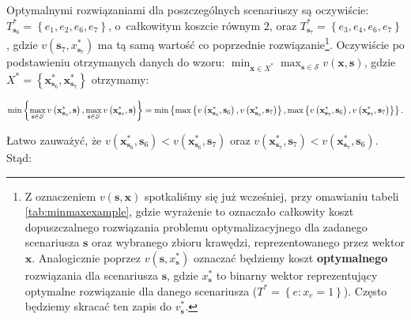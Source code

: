 Optymalnymi rozwiązaniami dla poszczególnych scenariuszy są oczywiście: $T^{\ast}_{\textbf{s}_{6}} = \left\{ e_{1}, e_{2}, e_{6}, e_{7} \right\}$, o~całkowitym koszcie równym $2$, oraz $T^{\ast}_{\textbf{s}_{7}} = \left\{ e_{3}, e_{4}, e_{6}, e_{7} \right\}$, gdzie $v \left( \textbf{s}_{7}, x^{\ast}_{\textbf{s}_{7}} \right)$ ma tą samą wartość co poprzednie rozwiązanie\footnote{
	Z oznaczeniem $v \left( \textbf{s}, \textbf{x} \right)$ spotkaliśmy się już wcześniej, przy omawianiu tabeli \ref{tab:minmaxexample}, gdzie wyrażenie to oznaczało całkowity koszt dopuszczalnego rozwiązania problemu optymalizacyjnego dla zadanego scenariusza $\textbf{s}$ oraz wybranego zbioru krawędzi, reprezentowanego przez wektor $\textbf{x}$.
	Analogicznie poprzez $v \left( \textbf{s}, x^{\ast}_{\textbf{s}} \right)$ oznaczać będziemy koszt \textbf{optymalnego} rozwiązania dla scenariusza $\textbf{s}$, gdzie $x^{\ast}_{\textbf{s}}$ to binarny wektor reprezentujący optymalne rozwiązanie dla danego scenariusza ($T^{\ast} = \left\{ e : x_{e} = 1 \right\}$).
	Często będziemy skracać ten zapis do $v^{\ast}_{\textbf{s}}$.}.
Oczywiście po podstawieniu otrzymanych danych do wzoru: $\min_{\textbf{x} \in X^{\ast}} \max_{\textbf{s} \in \mathcal{S}} v \left( \textbf{x}, \textbf{s} \right)$, gdzie $X^{\ast} = \left\{ \textbf{x}^{\ast}_{\textbf{s}_{6}}, \textbf{x}^{\ast}_{\textbf{s}_{7}} \right\}$ otrzymamy:

\begin{equation*}
	\min \left\{ \max_{ \mathclap{\textbf{s} \in \mathcal{S}}} v \left( \textbf{x}^{\ast}_{\textbf{s}_{6}}, \textbf{s} \right), \max_{\mathclap{\textbf{s} \in \mathcal{S}}} v \left( \textbf{x}^{\ast}_{\textbf{s}_{7}}, \textbf{s} \right)  \right\} = \min \left\{ \max \left\{ v \left( \textbf{x}^{\ast}_{\textbf{s}_{6}}, \textbf{s}_{6} \right), v \left( \textbf{x}^{\ast}_{\textbf{s}_{6}}, \textbf{s}_{7} \right) \right\}, \max \left\{ v \left( \textbf{x}^{\ast}_{\textbf{s}_{7}}, \textbf{s}_{6} \right), v \left( \textbf{x}^{\ast}_{\textbf{s}_{7}}, \textbf{s}_{7} \right) \right\} \right\}\text{.}
\end{equation*}

Łatwo zauważyć, że $v \left( \textbf{x}^{\ast}_{\textbf{s}_{6}}, \textbf{s}_{6} \right) < v \left( \textbf{x}^{\ast}_{\textbf{s}_{6}}, \textbf{s}_{7} \right)$ oraz $v \left( \textbf{x}^{\ast}_{\textbf{s}_{7}}, \textbf{s}_{7} \right) < v \left( \textbf{x}^{\ast}_{\textbf{s}_{7}}, \textbf{s}_{6} \right)$. Stąd:

